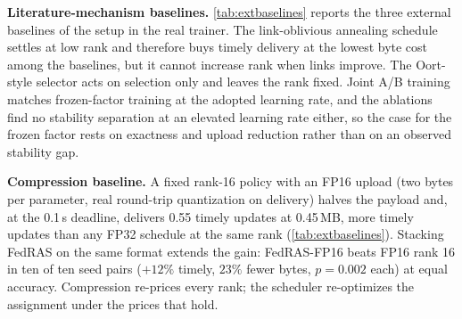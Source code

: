 \documentclass[a4paper,fleqn]{cas-dc}
\begin{document}
\label{sec:extbase}
\textbf{Literature-mechanism baselines.} \cref{tab:extbaselines} reports the three external baselines of the setup in the real trainer. The link-oblivious annealing schedule settles at low rank and therefore buys timely delivery at the lowest byte cost among the baselines, but it cannot increase rank when links improve. The Oort-style selector acts on selection only and leaves the rank fixed. Joint A/B training matches frozen-factor training at the adopted learning rate, and the ablations find no stability separation at an elevated learning rate either, so the case for the frozen factor rests on exactness and upload reduction rather than on an observed stability gap.
\par
\textbf{Compression baseline.} A fixed rank-16 policy with an FP16 upload (two bytes per parameter, real round-trip quantization on delivery) halves the payload and, at the 0.1\,s deadline, delivers 0.55 timely updates at 0.45\,MB, more timely updates than any FP32 schedule at the same rank (\cref{tab:extbaselines}). Stacking FedRAS on the same format extends the gain: FedRAS-FP16 beats FP16 rank 16 in ten of ten seed pairs ($+12\%$ timely, $23\%$ fewer bytes, $p = 0.002$ each) at equal accuracy. Compression re-prices every rank; the scheduler re-optimizes the assignment under the prices that hold.
\par
\par
\end{document}
